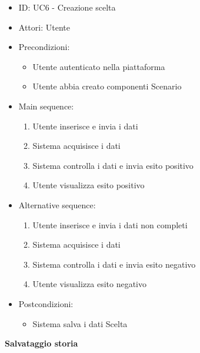 \documentclass{article}
\begin{document}
\begin{itemize}[label = { }]
    \itemsep0px
    \item ID: UC6 - Creazione scelta
    \item Attori: Utente
    \item Precondizioni: 
        \begin{itemize}[label = {-}]
            \item Utente autenticato nella piattaforma
            \item Utente abbia creato componenti Scenario
        \end{itemize}
    \item Main sequence: 
        \begin{enumerate}
            \item Utente inserisce e invia i dati
            \item Sistema acquisisce i dati
            \item Sistema controlla i dati e invia esito positivo
            \item Utente visualizza esito positivo
        \end{enumerate}
    \item Alternative sequence:
        \begin{enumerate}
            \item Utente inserisce e invia i dati non completi
            \item Sistema acquisisce i dati
            \item Sistema controlla i dati e invia esito negativo
            \item Utente visualizza esito negativo
        \end{enumerate}
    \item Postcondizioni: 
        \begin{itemize}[label = {-}]
            \item Sistema salva i dati Scelta
        \end{itemize}
\end{itemize}
\textbf{Salvataggio storia}
\end{document}
